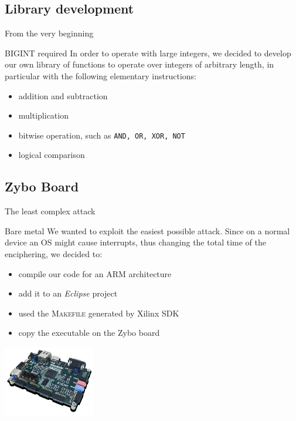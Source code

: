 \documentclass{beamer}
\begin{document}
\subsection{Library development}
\begin{frame}{From the very beginning}
	\begin{block}{BIGINT required}
		In order to operate with large integers, we decided to develop our own library of functions to operate over integers of arbitrary length, in particular with the following elementary instructions:
		\begin{itemize}
			\item addition and subtraction
			\item multiplication
			\item bitwise operation, such as \texttt{AND, OR, XOR, NOT}
			\item logical comparison
		\end{itemize}
	\end{block}
\end{frame}

\subsection{Zybo Board}
\begin{frame}{The least complex attack}
	\begin{block}{Bare metal}
		We wanted to exploit the easiest possible attack. Since on a normal device an OS might cause interrupts, thus changing the total time of the enciphering, we decided to:
		\begin{itemize}
			\item compile our code for an ARM architecture
			\item add it to an \textit{Eclipse} project
			\item used the \textsc{Makefile} generated by Xilinx SDK
			\item copy the executable on the Zybo board
		\end{itemize}
    \begin{center}
      \includegraphics[width=4cm]{./graphics/zybo}
    \end{center}
	\end{block}
\end{frame}
\end{document}
